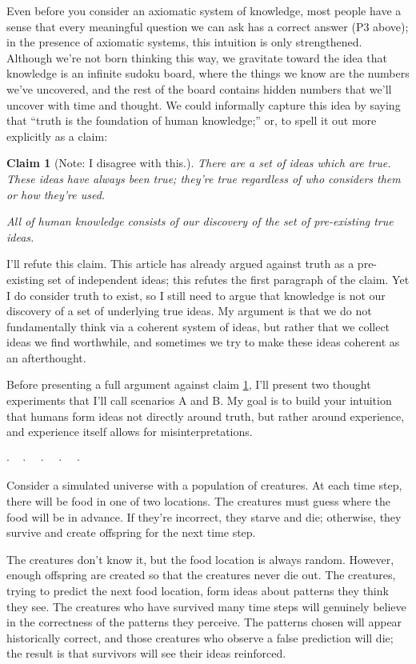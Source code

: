 \documentclass[11pt, oneside]{article}   	%
\newtheorem{claim}{Claim}
\newcommand{\dotq}{\cdot\quad}
\newcommand{\scenebreak}{
    \medskip\centerline{$\dotq\dotq\dotq\dotq\cdot$}\medskip
}
\begin{document}
Even before you consider an axiomatic system of knowledge, most people have a
sense that every meaningful question we can ask has a correct answer (P3
above); in the presence of axiomatic systems, this intuition is only
strengthened.
Although we're not born thinking this way,
we gravitate toward
the idea that knowledge is an infinite sudoku board, where
the things we know are the numbers we've uncovered, and the rest of the board
contains hidden numbers that we'll uncover with time and thought.
We could informally capture this idea by saying that ``truth is the foundation
of
human knowledge;'' or, to spell it out more explicitly as a claim:
\begin{claim}[Note: I disagree with this.]\label{c8}
    There are a set of ideas which are true.
    These ideas have always been true; they're true
    regardless of who considers them or how they're used.

    All of human knowledge consists of our discovery
    of the set of pre-existing true ideas.
\end{claim}

I'll refute this claim.
This article has already argued against truth
as a pre-existing set of independent ideas; this refutes the first paragraph of
the claim.
Yet I do consider truth to exist, so I still need to argue that knowledge is not
our discovery of a set of underlying true ideas.
My argument is that we
do not fundamentally
think via a coherent system of ideas, but rather that we collect ideas we
find worthwhile, and sometimes we try to make these ideas coherent as an
afterthought.

Before presenting a full argument against claim \ref{c8}, I'll present two
thought experiments that I'll call scenarios A and B.
My goal is to build your intuition that humans form ideas not directly around
truth, but rather around experience, and experience itself allows for
misinterpretations.

\scenebreak

\noindent [{\bf Scenario A.}]\quad
        Consider a simulated universe with a
        population of creatures. At each time step, there will be food in
        one of two locations.
        The creatures must guess where the food will
        be in advance. If they're incorrect, they starve and die; otherwise,
        they survive and create offspring for the next time step.

        The creatures don't know it, but the food location is always random.
        However, enough offspring are created so that the creatures never
        die out. The creatures, trying to predict the next food location,
        form ideas about patterns they think they see.
        The creatures who have survived
        many time steps will genuinely
        believe in the correctness of the patterns they perceive.
        The patterns chosen will appear historically correct, and those
        creatures who observe a false prediction will die; the result is that
        survivors will see their ideas reinforced.
\end{document}
